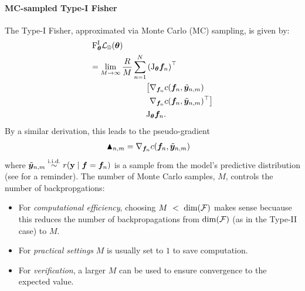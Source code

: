 \paragraph{MC-sampled Type-I Fisher}
The Type-I Fisher, approximated via Monte Carlo (MC) sampling, is given by:
\begin{align*}
&\mathrm{F}^{\text{I}}_{{\bm{\theta}}}{\mathcal{L}}_{{\mathbb{D}}}({\bm{\theta}}) \\
&\begin{aligned}
= \lim_{M \to \infty} \frac{R}{M} \sum_{n=1}^N
  &\left( \mathrm{J}_{{\bm{\theta}}} {\bm{f}}_n\right)^{\top} \\
  &
\begin{aligned}
  \big[ 
  &\nabla_{{\bm{f}}_n} c({\bm{f}}_n, \tilde{{\bm{y}}}_{n,m}) \\
  &\nabla_{{\bm{f}}_n} c({\bm{f}}_n, \tilde{{\bm{y}}}_{n,m})^{\top}
  \big] 
\end{aligned} \\
  &\mathrm{J}_{{\bm{\theta}}} {\bm{f}}_n.
\end{aligned}
\end{align*}
By a similar derivation, this leads to the pseudo-gradient
\begin{align*}
  \blacktriangle_{n,m}
  &= \nabla_{{\bm{f}}_n}  c({\bm{f}}_n, \tilde{{\bm{y}}}_{n,m})
\end{align*}
where $\tilde{{\bm{y}}}_{n,m} \stackrel{\text{i.i.d.}}{\sim} r({\mathbf{y}} \mid {\bm{f}} = {\bm{f}}_n)$ is a sample from the model's predictive distribution (see  for a reminder).
The number of Monte Carlo samples, $M$, controls the number of backpropgations:
\begin{itemize}
 \item For \emph{computational efficiency}, choosing $M~<~\dim({\mathcal{F}})$ makes sense becuause this reduces the number of backpropagations from $\dim({\mathcal{F}})$ (as in the Type-II case) to $M$.
 \item For \emph{practical settings} $M$ is usually set to $1$ to save computation.
 \item For \emph{verification}, a larger $M$ can be used to ensure convergence to the expected value.
\end{itemize}

